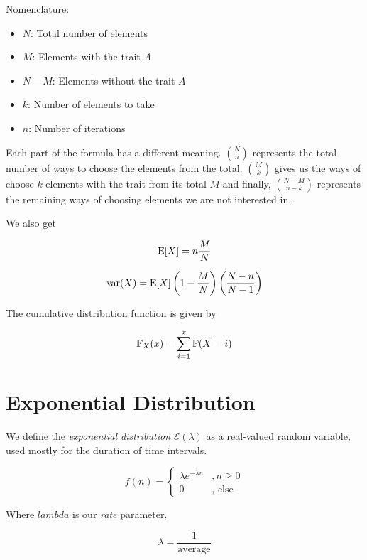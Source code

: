 Nomenclature:

\begin{itemize}

    \item \(N\): Total number of elements

    \item \(M\): Elements with the trait \(A\)

    \item \(N - M\): Elements without the trait \(A\)

    \item \(k\): Number of elements to take

    \item \(n\): Number of iterations

\end{itemize}

Each part of the formula has a different meaning. \(\binom{N}{n}\) represents the total number of ways to choose the elements from the total.
\(\binom{M}{k}\) gives us the ways of choose \(k\) elements with the trait from its total \(M\) and finally, \(\binom{N - M}{n - k}\) represents the 
remaining ways of choosing elements we are not interested in.

We also get 

\[
    \mathrm{E}[X] = n \frac{M}{N}
\]

\[
    \mathrm{var}(X) = \mathrm{E}[X]\left(1 - \frac{M}{N}\right) \left(\frac{N - n}{N - 1}\right)
\]

The cumulative distribution function is given by 

\[
    \mathbb{F}_X (x) = \sum_{i = 1}^{x} \mathbb{P}(X = i)
\]

\section{Exponential Distribution}

We define the \emph{exponential distribution} \(\mathcal{E}(\lambda)\) as a real-valued random variable, used mostly 
for the duration of time intervals.

\[
    f(n) = \begin{cases}
	\lambda e^{- \lambda n} &, n \ge 0 \\ 
	0 &, \text{ else }
    \end{cases} 
\] 

Where \(lambda\) is our \emph{rate} parameter. 

\[
    \lambda = \frac{1}{\text{average}}
\]

